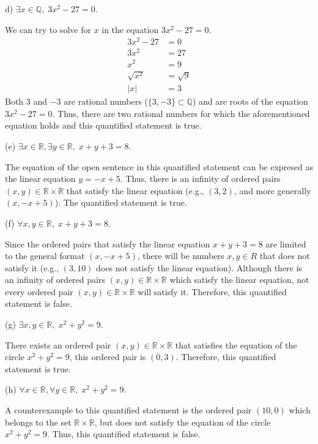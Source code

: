 \documentclass[12pt]{article}
\newenvironment{problem}[2][Problem]{\begin{trivlist}
		\item[\hskip \labelsep {\bfseries #1}\hskip \labelsep {\bfseries #2.}]}{\end{trivlist}}
\newenvironment{solution}[2][Solution]{\begin{trivlist}
		\item[\hskip \labelsep {\bfseries #1}\hskip \labelsep {\bfseries #2.}]}{\end{trivlist}}
\begin{document}
\begin{problem}{70}
	(d) $\exists x \in \mathbb{Q}, \; 3x^{2}-27 =0$.\\
	\begin{solution}{d}
	We can try to solve for $x$ in the equation $3x^{2} -27 =0$.
	\begin{align*}
		3x^{2} -27 &= 0\\
		3x^{2} &= 27\\
		x^{2} &= 9\\
		\sqrt{x^{2}} &= \sqrt{9}\\
		|x| &= 3
	\end{align*} 
Both 3 and $-3$ are rational numbers ($\{3,-3\} \subset \mathbb{Q}$) and are roots of the equation $3x^{2} -27 = 0$. Thus, there are two rational numbers for which the aforementioned equation holds and this quantified statement is true.\\
\end{solution}
(e) $\exists x \in \mathbb{R}, \exists y \in \mathbb{R}, \; x+y+3=8.$\\
\begin{solution}{e}
The equation of the open sentence in this quantified statement can be expresed as the linear equation $y = -x +5$. Thus, there is an infinity of ordered pairs $(x,y) \in \mathbb{R}\times \mathbb{R}$ that satisfy the linear equation (e.g., $(3,2)$, and more generally $(x, -x+5)$). The quantified statement is true.\\
\end{solution}
(f) $\forall x,y \in \mathbb{R}, \; x + y + 3 = 8.$\\
\begin{solution}{f}
Since the ordered pairs that satisfy the linear equation $x + y +3 =8$ are limited to the general format $(x, -x +5)$, there will be numbers $x,y \in R$ that does not satisfy it (e.g., $(3,10)$ does not satisfy the linear equation). Although there is an infinity of ordered pairs $(x,y) \in \mathbb{R}\times \mathbb{R}$ which satisfy the linear equation, not every ordered pair $(x,y) \in \mathbb{R}\times \mathbb{R}$ will satisfy it. Therefore, this quantified statement is false.\\
\end{solution}
(g) $\exists x, y \in \mathbb{R}, \; x^{2} + y^{2}=9.$\\
\begin{solution}{g}
There exists an ordered pair $(x,y)\in \mathbb{R}\times \mathbb{R}$ that satisfies the equation of the circle $x^{2} + y^{2} =9$, this ordered pair is $(0,3)$. Therefore, this quantified statement is true.\\
\end{solution}
(h) $\forall x \in \mathbb{R}, \forall y \in \mathbb{R}, \; x^{2} + y^{2} =9.$\\
\begin{solution}{h} 
A counterexample to this quantified statement is the ordered pair $(10,0)$ which belongs to the set $\mathbb{R}\times \mathbb{R}$, but does not satisfy the equation of the circle $x^{2} + y^{2} = 9$. Thus, this quantified statement is false.
\end{solution}
\end{problem}
\end{document}
